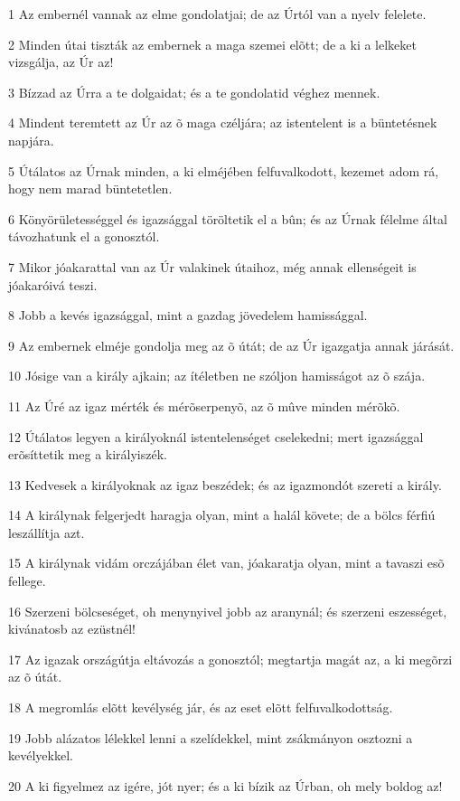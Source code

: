 \par 1 Az embernél vannak az elme gondolatjai; de az Úrtól van a nyelv felelete.
\par 2 Minden útai tiszták az embernek a maga szemei elõtt; de a ki a lelkeket vizsgálja, az Úr az!
\par 3 Bízzad az Úrra a te dolgaidat; és a te gondolatid véghez mennek.
\par 4 Mindent teremtett az Úr az õ maga czéljára; az istentelent is a büntetésnek napjára.
\par 5 Útálatos az Úrnak minden, a ki elméjében felfuvalkodott, kezemet adom rá, hogy nem marad büntetetlen.
\par 6 Könyörületességgel és igazsággal töröltetik el a bûn; és az Úrnak félelme által távozhatunk el a gonosztól.
\par 7 Mikor jóakarattal van az Úr valakinek útaihoz, még annak ellenségeit is jóakaróivá teszi.
\par 8 Jobb a kevés igazsággal, mint a gazdag jövedelem hamissággal.
\par 9 Az embernek elméje gondolja meg az õ útát; de az Úr igazgatja annak járását.
\par 10 Jósige van a király ajkain; az ítéletben ne szóljon hamisságot az õ szája.
\par 11 Az Úré az igaz mérték és mérõserpenyõ, az õ mûve minden mérõkõ.
\par 12 Útálatos legyen a királyoknál istentelenséget cselekedni; mert igazsággal erõsíttetik meg a királyiszék.
\par 13 Kedvesek a királyoknak az igaz beszédek; és az  igazmondót szereti a király.
\par 14 A királynak felgerjedt haragja olyan, mint a halál követe; de a bölcs férfiú leszállítja azt.
\par 15 A királynak vidám orczájában élet van, jóakaratja olyan, mint a tavaszi esõ fellege.
\par 16 Szerzeni bölcseséget, oh menynyivel jobb az aranynál; és szerzeni eszességet, kivánatosb az ezüstnél!
\par 17 Az igazak országútja eltávozás a gonosztól; megtartja magát az, a ki megõrzi az õ útát.
\par 18 A megromlás elõtt kevélység jár, és az eset elõtt felfuvalkodottság.
\par 19 Jobb alázatos lélekkel lenni a szelídekkel, mint zsákmányon osztozni a kevélyekkel.
\par 20 A ki figyelmez az igére, jót nyer; és a ki bízik az Úrban, oh mely boldog az!
